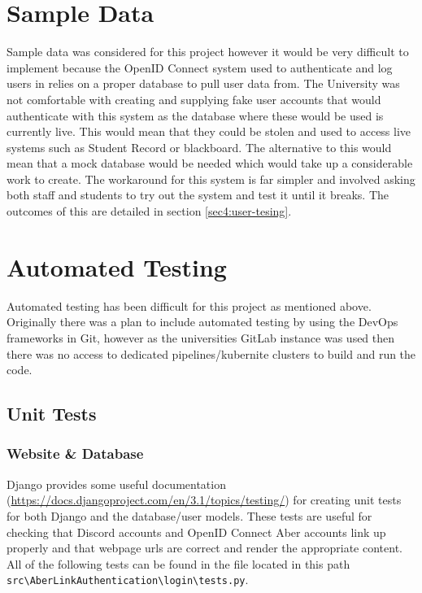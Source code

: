 \section{Sample Data}
Sample data was considered for this project however it would be very difficult to implement because the OpenID Connect \cite{OpenID} system used to authenticate and log users in relies on a proper database to pull user data from. The University was not comfortable with creating and supplying fake user accounts that would authenticate with this system as the database where these would be used is currently live. This would mean that they could be stolen and used to access live systems such as Student Record or blackboard. The alternative to this would mean that a mock database would be needed which would take up a considerable work to create. The workaround for this system is far simpler and involved asking both staff and students to try out the system and test it until it breaks. The outcomes of this are detailed in section \ref{sec4:user-tesing}.

\section{Automated Testing}
Automated testing has been difficult for this project as mentioned above. Originally there was a plan to include automated testing by using the DevOps frameworks in Git, however as the universities GitLab instance was used then there was no access to dedicated pipelines/kubernite clusters to build and run the code.  

\subsection{Unit Tests}

\subsubsection{Website \& Database}\label{sec4:unit-web}
Django provides some useful documentation (\href{https://docs.djangoproject.com/en/3.1/topics/testing/}{https://docs.djangoproject.com/en/3.1/topics/testing/}) for creating unit tests for both Django and the database/user models. These tests are useful for checking that Discord accounts and OpenID Connect \cite{OpenID} Aber accounts link up properly and that webpage urls are correct and render the appropriate content. All of the following tests can be found in the file located in this path \verb|src\AberLinkAuthentication\login\tests.py|. 

